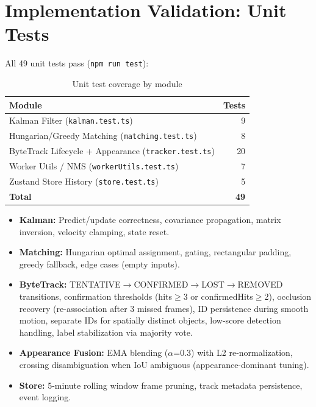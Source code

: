 \section{Implementation Validation: Unit Tests}
\label{sec:unit-tests}

All 49 unit tests pass (\texttt{npm run test}):

\begin{table}[htbp]
\centering
\caption{Unit test coverage by module}
\label{tab:tests}
\begin{tabular}{@{}lr@{}}
\toprule
\textbf{Module} & \textbf{Tests} \\
\midrule
Kalman Filter (\texttt{kalman.test.ts}) & 9 \\
Hungarian/Greedy Matching (\texttt{matching.test.ts}) & 8 \\
ByteTrack Lifecycle + Appearance (\texttt{tracker.test.ts}) & 20 \\
Worker Utils / NMS (\texttt{workerUtils.test.ts}) & 7 \\
Zustand Store History (\texttt{store.test.ts}) & 5 \\
\midrule
\textbf{Total} & \textbf{49} \\
\bottomrule
\end{tabular}
\end{table}

\begin{itemize}
    \item \textbf{Kalman:} Predict/update correctness, covariance propagation, matrix inversion, velocity clamping, state reset.
    \item \textbf{Matching:} Hungarian optimal assignment, gating, rectangular padding, greedy fallback, edge cases (empty inputs).
    \item \textbf{ByteTrack:} TENTATIVE$\to$CONFIRMED$\to$LOST$\to$REMOVED transitions, confirmation thresholds (hits$\ge$3 or confirmedHits$\ge$2), occlusion recovery (re-association after 3 missed frames), ID persistence during smooth motion, separate IDs for spatially distinct objects, low-score detection handling, label stabilization via majority vote.
    \item \textbf{Appearance Fusion:} EMA blending ($\alpha$=0.3) with L2 re-normalization, crossing disambiguation when IoU ambiguous (appearance-dominant tuning).
    \item \textbf{Store:} 5-minute rolling window frame pruning, track metadata persistence, event logging.
\end{itemize}

